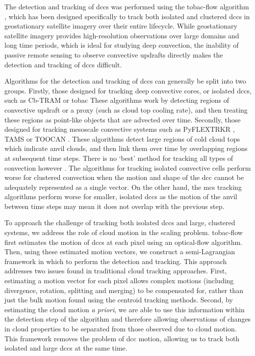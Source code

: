 \documentclass[acp, manuscript]{copernicus}
\begin{document}
The detection and tracking of \acrshort{dcc}s was performed using the tobac-flow algorithm \citep{jones_semilagrangian_2023}, which has been designed specifically to track both isolated and clustered \acrshort{dcc}s in geostationary satellite imagery over their entire lifecycle. 
While geostationary satellite imagery provides high-resolution observations over large domains and long time periods, which is ideal for studying deep convection, the inability of passive remote sensing to observe convective updrafts directly makes the detection and tracking of \acrshort{dcc}s difficult.

Algorithms for the detection and tracking of \acrshort{dcc}s can generally be split into two groups. 
Firstly, those designed for tracking deep convective cores, or isolated \acrshort{dcc}s, such as Cb-TRAM \citep{zinner_cbtram_2008,zinner_validation_2013} or tobac \citep{heikenfeld_tobac_2019}
These algorithms work by detecting regions of convective updraft or a proxy (such as cloud top cooling rate), and then treating these regions as point-like objects that are advected over time. 
Secondly, those designed for tracking mesoscale convective systems such as PyFLEXTRKR \citep{feng_pyflextrkr_2022}, TAMS \citep{ocasio_tracking_2020} or TOOCAN \citep{fiolleau_algorithm_2013}. 
These algorithms detect large regions of cold cloud tops which indicate anvil clouds, and then link them over time by overlapping regions at subsequent time steps. 
There is no `best' method for tracking all types of convection however \citep{lakshmanan_objective_2010}. 
The algorithms for tracking isolated convective cells perform worse for clustered convection when the motion and shape of the \acrshort{dcc} cannot be adequately represented as a single vector. 
On the other hand, the \acrshort{mcs} tracking algorithms perform worse for smaller, isolated \acrshort{dcc}s as the motion of the anvil between time steps may mean it does not overlap with the previous step.

To approach the challenge of tracking both isolated \acrshort{dcc}s and large, clustered systems, we address the role of cloud motion in the scaling problem. 
tobac-flow first estimates the motion of \acrshort{dcc}s at each pixel using an optical-flow algorithm. 
Then, using these estimated motion vectors, we construct a semi-Lagrangian framework in which to perform the detection and tracking. 
This approach addresses two issues found in traditional cloud tracking approaches.
First, estimating a motion vector for each pixel allows complex motions (including divergence, rotation, splitting and merging) to be compensated for, rather than just the bulk motion found using the centroid tracking methods.
Second, by estimating the cloud motion \textit{a priori}, we are able to use this information within the detection step of the algorithm and therefore allowing observations of changes in cloud properties to be separated from those observed due to cloud motion.
This framework removes the problem of \acrshort{dcc} motion, allowing us to track both isolated and large \acrshort{dcc}s at the same time.
\end{document}
